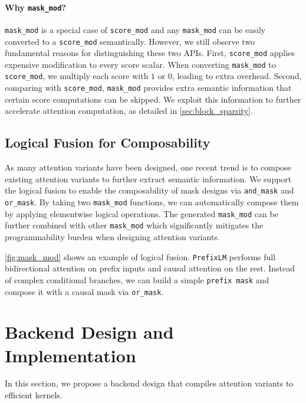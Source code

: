 \paragraph{Why \texttt{mask\_mod}?}
\texttt{mask\_mod} is a special case of \texttt{score\_mod} and any \texttt{mask\_mod} can be easily converted to a \texttt{score\_mod} semantically.
However, we still observe two fundamental reasons for distinguishing these two APIs.
First, \texttt{score\_mod} applies expensive modification to every score scalar. When converting \texttt{mask\_mod} to \texttt{score\_mod}, we multiply each score with $1$ or $0$, leading to extra overhead.
Second, comparing with \texttt{score\_mod}, \texttt{mask\_mod} provides extra semantic information that certain score computations can be skipped. 
We exploit this information to further accelerate attention computation, as detailed in \autoref{sec:block_sparsity}.


\subsection{Logical Fusion for Composability}
\label{sec:logical_fusion}
As many attention variants have been designed, one recent trend is to compose existing attention variants to further extract semantic information.
We support the logical fusion to enable the composability of mask designs via \texttt{and\_mask} and \texttt{or\_mask}.
By taking two \texttt{mask\_mod} functions, we can automatically compose them by applying elementwise logical operations.
The generated \texttt{mask\_mod} can be further combined with other \texttt{mask\_mod} which significantly mitigates the programmability burden when designing attention variants.

\autoref{fig:mask_mod} shows an example of logical fusion. \texttt{PrefixLM} \cite{T5} performs full bidirectional attention on prefix inputs and causal attention on the rest.
Instead of complex conditional branches, we can build a simple \texttt{prefix mask} and compose it with a causal mask via \texttt{or\_mask}.






\section{Backend Design and Implementation}
In this section, we propose a backend design that compiles attention variants to efficient kernels.






